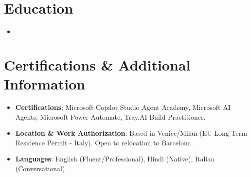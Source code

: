 \documentclass[10pt,a4paper,sans]{moderncv}
\begin{document}
\section{Education}
\vspace{1pt}
\begin{itemize}
\item{}
\end{itemize}
\vspace{3pt}

\section{Certifications \& Additional Information}
\vspace{1pt}
\begin{itemize}
\item \textbf{Certifications}: Microsoft Copilot Studio Agent Academy, Microsoft AI Agents, Microsoft Power Automate, Tray.AI Build Practitioner.
\item \textbf{Location \& Work Authorization}: Based in Venice/Milan (EU Long Term Residence Permit - Italy). Open to relocation to Barcelona.
\item \textbf{Languages}: English (Fluent/Professional), Hindi (Native), Italian (Conversational).
\end{itemize}
\end{document}
